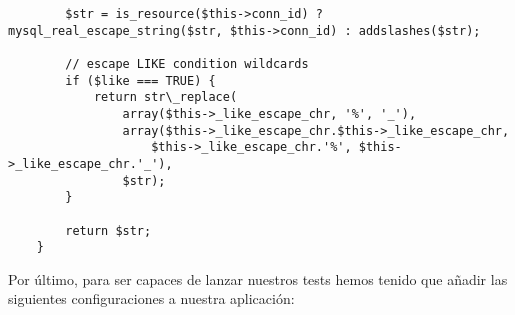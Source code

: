 \begin{itemize}
\begin{lstlisting}
        $str = is_resource($this->conn_id) ? mysql_real_escape_string($str, $this->conn_id) : addslashes($str);

        // escape LIKE condition wildcards
        if ($like === TRUE) {
            return str\_replace(
                array($this->_like_escape_chr, '%', '_'),
                array($this->_like_escape_chr.$this->_like_escape_chr,
                    $this->_like_escape_chr.'%', $this->_like_escape_chr.'_'),
                $str);
        }

        return $str;
    }
                \end{lstlisting}

\end{itemize}

Por último, para ser capaces de lanzar nuestros tests hemos tenido que añadir las siguientes configuraciones a nuestra aplicación:

